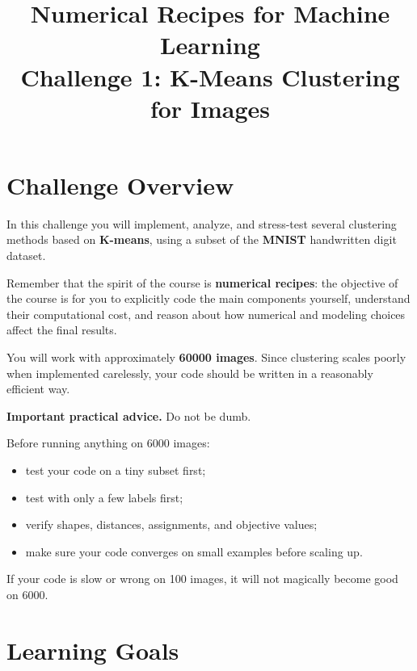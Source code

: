 \documentclass[11pt]{article}
\title{\textbf{Numerical Recipes for Machine Learning}\\Challenge 1: K-Means Clustering for Images}
\author{}
\date{}
\begin{document}
\maketitle

\section*{Challenge Overview}

In this challenge you will implement, analyze, and stress-test several clustering methods based on \textbf{K-means}, using a subset of the \textbf{MNIST} handwritten digit dataset.

Remember that the spirit of the course is \textbf{numerical recipes}: the objective of the course is for you to explicitly code the main components yourself, understand their computational cost, and reason about how numerical and modeling choices affect the final results.

You will work with approximately \textbf{60000 images}. Since clustering scales poorly when implemented carelessly, your code should be written in a reasonably efficient way.

\begin{warningbox}
\textbf{Important practical advice.}
Do not be dumb.

Before running anything on 6000 images:
\begin{itemize}[itemsep=2pt]
    \item test your code on a tiny subset first;
    \item test with only a few labels first;
    \item verify shapes, distances, assignments, and objective values;
    \item make sure your code converges on small examples before scaling up.
\end{itemize}
If your code is slow or wrong on 100 images, it will not magically become good on 6000.
\end{warningbox}


\section*{Learning Goals}
\end{document}
